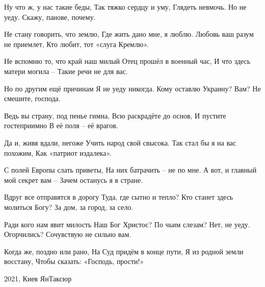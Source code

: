 Ну что ж, у нас такие беды,
Так тяжко сердцу и уму,
Глядеть невмочь. Но не уеду.
Скажу, панове, почему.

Не стану говорить, что землю,
Где жить дано мне, я люблю.
Любовь ваш разум не приемлет,
Кто любит, тот «слуга Кремлю».

Не вспомню то, что край наш милый
Отец прошёл в военный час,
И что здесь матери могила – 
Такие речи не для вас.

Но по другим ещё причинам
Я не уеду никогда.
Кому оставлю Украину?
Вам? Не смешите, господа.

Ведь вы страну, под пенье гимна,
Всю раскрадёте до основ,
И пустите гостеприимно
В её поля – её врагов.

Да и, живя вдали, негоже
Учить народ свой свысока.
Так стал бы я на вас похожим,
Как «патриот издалека».

С полей Европы слать приветы,
На них батрачить – не по мне.
А вот, и главный мой секрет вам – 
Зачем останусь я в стране.

Вдруг все отправятся в дорогу
Туда, где сытно и тепло?
Кто станет здесь молиться Богу?
За дом, за город, за село.

Ради кого нам явит милость
Наш Бог Христос? По чьим слезам?
Нет, не уеду. Огорчились?
Сочувствую не сильно вам.

Когда же, поздно или рано,
На Суд придём в конце пути,
Я из родной земли восстану,
Чтобы сказать: «Господь, прости!»

2021, Киев
ЯнТаксюр


